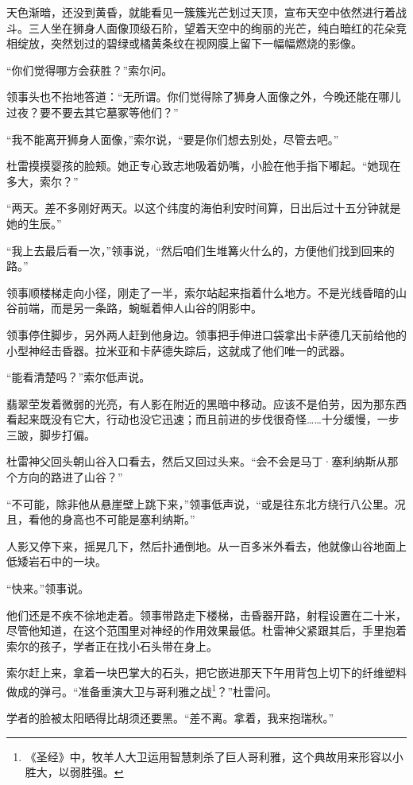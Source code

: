 \documentclass[AutoFakeBold=true]{book}
\begin{document}
天色渐暗，还没到黄昏，就能看见一簇簇光芒划过天顶，宣布天空中依然进行着战斗。三人坐在狮身人面像顶级石阶，望着天空中的绚丽的光芒，纯白暗红的花朵竞相绽放，突然划过的碧绿或橘黄条纹在视网膜上留下一幅幅燃烧的影像。

``你们觉得哪方会获胜？''索尔问。

领事头也不抬地答道：``无所谓。你们觉得除了狮身人面像之外，今晚还能在哪儿过夜？要不要去其它墓冢等他们？''

``我不能离开狮身人面像，''索尔说，``要是你们想去别处，尽管去吧。''

杜雷摸摸婴孩的脸颊。她正专心致志地吸着奶嘴，小脸在他手指下嘟起。``她现在多大，索尔？''

``两天。差不多刚好两天。以这个纬度的海伯利安时间算，日出后过十五分钟就是她的生辰。''

``我上去最后看一次，''领事说，``然后咱们生堆篝火什么的，方便他们找到回来的路。''

领事顺楼梯走向小径，刚走了一半，索尔站起来指着什么地方。不是光线昏暗的山谷前端，而是另一条路，蜿蜒着伸人山谷的阴影中。

领事停住脚步，另外两人赶到他身边。领事把手伸进口袋拿出卡萨德几天前给他的小型神经击昏器。拉米亚和卡萨德失踪后，这就成了他们唯一的武器。

``能看清楚吗？''索尔低声说。

翡翠茔发着微弱的光亮，有人影在附近的黑暗中移动。应该不是伯劳，因为那东西看起来既没有它大，行动也没它迅速；而且前进的步伐很奇怪……十分缓慢，一步三跛，脚步打偏。

杜雷神父回头朝山谷入口看去，然后又回过头来。``会不会是马丁·塞利纳斯从那个方向的路进了山谷？''

``不可能，除非他从悬崖壁上跳下来，''领事低声说，``或是往东北方绕行八公里。况且，看他的身高也不可能是塞利纳斯。''

人影又停下来，摇晃几下，然后扑通倒地。从一百多米外看去，他就像山谷地面上低矮岩石中的一块。

``快来。''领事说。

他们还是不疾不徐地走着。领事带路走下楼梯，击昏器开路，射程设置在二十米，尽管他知道，在这个范围里对神经的作用效果最低。杜雷神父紧跟其后，手里抱着索尔的孩子，学者正在找小石头带在身上。

索尔赶上来，拿着一块巴掌大的石头，把它嵌进那天下午用背包上切下的纤维塑料做成的弹弓。``准备重演大卫与哥利雅之战\footnote{《圣经》中，牧羊人大卫运用智慧刺杀了巨人哥利雅，这个典故用来形容以小胜大，以弱胜强。}？''杜雷问。

学者的脸被太阳晒得比胡须还要黑。``差不离。拿着，我来抱瑞秋。''
\end{document}
